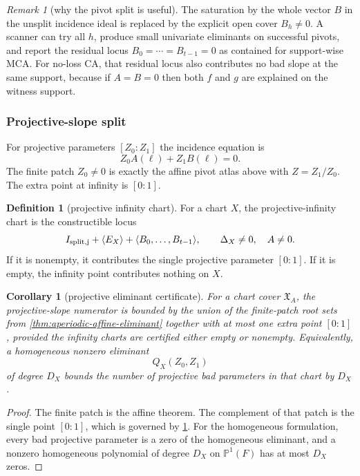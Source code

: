 \documentclass[11pt]{article}
\newtheorem{corollary}[theorem]{Corollary}
\theoremstyle{definition}
\newtheorem{definition}[theorem]{Definition}
\theoremstyle{remark}
\newtheorem{remark}[theorem]{Remark}
\begin{document}
\begin{remark}[why the pivot split is useful]
\label{rem:pivot-split-useful}
The saturation by the whole vector $B$ in the unsplit incidence ideal is replaced
by the explicit open cover $B_h\ne0$.  A scanner can try all $h$, produce small
univariate eliminants on successful pivots, and report the residual locus
$B_0=\cdots=B_{t-1}=0$ as contained for support-wise MCA.  For no-loss CA, that
residual locus also contributes no bad slope at the same support, because if
$A=B=0$ then both $f$ and $g$ are explained on the witness support.
\end{remark}

\subsubsection{Projective-slope split}

For projective parameters $[Z_0:Z_1]$ the incidence equation is
\[
        Z_0A(\ell)+Z_1B(\ell)=0 .
\]
The finite patch $Z_0\ne0$ is exactly the affine pivot atlas above with
$Z=Z_1/Z_0$.  The extra point at infinity is $[0:1]$.

\begin{definition}[projective infinity chart]
\label{def:projective-infinity-chart}
For a chart $X$, the projective-infinity chart is the constructible locus
\[
        I_{\rm split,j}+\langle E_X\rangle+
        \langle B_0,\ldots,B_{t-1}\rangle,
        \qquad
        \Delta_X\ne0,
        \quad A\ne0 .
\]
If it is nonempty, it contributes the single projective parameter $[0:1]$.
If it is empty, the infinity point contributes nothing on $X$.
\end{definition}

\begin{corollary}[projective eliminant certificate]
\label{cor:projective-eliminant-certificate}
For a chart cover $\mathfrak X_A$, the projective-slope numerator is bounded by
the union of the finite-patch root sets from
\cref{thm:aperiodic-affine-eliminant} together with at most one extra point
$[0:1]$, provided the infinity charts are certified either empty or nonempty.
Equivalently, a homogeneous nonzero eliminant
\[
        Q_X(Z_0,Z_1)
\]
of degree $D_X$ bounds the number of projective bad parameters in that chart by
$D_X$.
\end{corollary}

\begin{proof}
The finite patch is the affine theorem.  The complement of that patch is the
single point $[0:1]$, which is governed by \cref{def:projective-infinity-chart}.
For the homogeneous formulation, every bad projective parameter is a zero of the
homogeneous eliminant, and a nonzero homogeneous polynomial of degree $D_X$ on
$\mathbb P^1(F)$ has at most $D_X$ zeros.
\end{proof}
\end{document}
